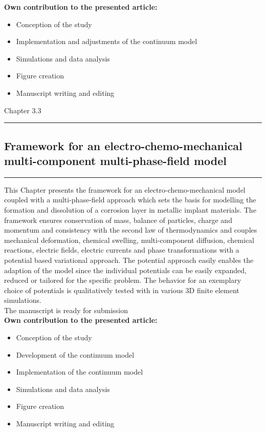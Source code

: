 \textbf{Own contribution to the presented article:}
\begin{itemize}
\item Conception of the study
\item Implementation and adjustments of the continuum model
\item Simulations and data analysis
\item Figure creation 
\item Manuscript writing and editing
\end{itemize}




\newpage
\Large {Chapter 3.3}
\normalsize
\vspace{0.3cm}
\hrule
\subsection*{\Large \centering Framework for an electro-chemo-mechanical multi-component multi-phase-field model}
\hrule
\vspace{1.5cm}

This Chapter presents the framework for an electro-chemo-mechanical model coupled with a multi-phase-field approach which sets the basis for modelling the formation and dissolution of a corrosion layer in metallic implant materials. The framework ensures conservation of mass, balance of particles, charge and momentum and consistency with the second law of thermodynamics and couples mechanical deformation, chemical swelling, multi-component diffusion, chemical reactions, electric fields, electric currents and phase transformations with a potential based variational approach. The potential approach easily enables the adaption of the model since the individual potentials can be easily expanded, reduced or tailored for the specific problem. The behavior for an exemplary choice of potentials is qualitatively tested with in various 3D finite element simulations.  \\

The manuscript is ready for submission \\

\textbf{Own contribution to the presented article:}
\begin{itemize}
\item Conception of the study
\item Development of the continuum model
\item Implementation of the continuum model
\item Simulations and data analysis
\item Figure creation 
\item Manuscript writing and editing
\end{itemize}


\newpage
% 
% 








